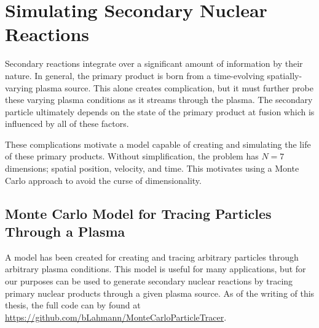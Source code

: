 \section{Simulating Secondary Nuclear Reactions}

	Secondary reactions integrate over a significant amount of information by their nature. In general, the primary product is born from a time-evolving spatially-varying plasma source. This alone creates complication, but it must further probe these varying plasma conditions as it streams through the plasma. The secondary particle ultimately depends on the state of the primary product at fusion which is influenced by all of these factors.
	
	These complications motivate a model capable of creating and simulating the life of these primary products. Without simplification, the problem has $N=7$ dimensions; spatial position, velocity, and time. This motivates using a Monte Carlo approach to avoid the curse of dimensionality. 
	
\subsection{Monte Carlo Model for Tracing Particles Through a Plasma}

	A model has been created for creating and tracing arbitrary particles through arbitrary plasma conditions. This model is useful for many applications, but for our purposes can be used to generate secondary nuclear reactions by tracing primary nuclear products through a given plasma source. As of the writing of this thesis, the full code can by found at \url{https://github.com/bLahmann/MonteCarloParticleTracer}.
	
